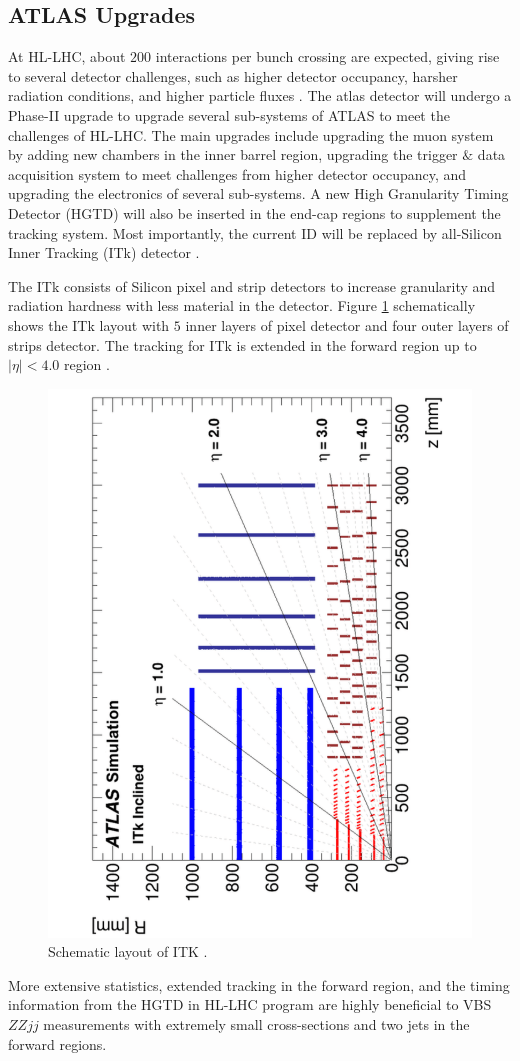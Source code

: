 \subsection{ATLAS Upgrades}
\label{subsec:ATLASUpgrade}
At HL-LHC, about $200$ interactions per bunch crossing are expected, giving rise to several detector challenges, such as higher detector occupancy, harsher radiation conditions, and higher particle fluxes \cite{HLLHC}. The atlas detector will undergo a Phase-II upgrade to upgrade several sub-systems of ATLAS to meet the challenges of HL-LHC. The main upgrades include upgrading the muon system by adding new chambers in the inner barrel region, upgrading the trigger $\&$ data acquisition system to meet challenges from higher detector occupancy, and upgrading the electronics of several sub-systems. A new High Granularity Timing Detector (HGTD) will also be inserted in the end-cap regions to supplement the tracking system. Most importantly, the current ID will be replaced by all-Silicon Inner Tracking (ITk) detector \cite{HLLHC}.

The ITk consists of Silicon pixel and strip detectors to increase granularity and radiation hardness with less material in the detector. Figure \ref{fig:ITKLayout} schematically shows the ITk layout with $5$ inner layers of pixel detector and four outer layers of strips detector. The tracking for ITk is extended in the forward region up to $|\eta| < 4.0$ region \cite{ITkStripsTDR}. 

\begin{figure}
    \centering
    \includegraphics[angle=270,width=.7\linewidth]{figures/LHC/ITKLayout.pdf}
    \caption{ Schematic layout of ITK \cite{ITkPixelTDR}.\label{fig:ITKLayout}}
\end{figure}

More extensive statistics, extended tracking in the forward region, and the timing information from the HGTD in HL-LHC program are highly beneficial to VBS $ZZjj$ measurements with extremely small cross-sections and two jets in the forward regions. 